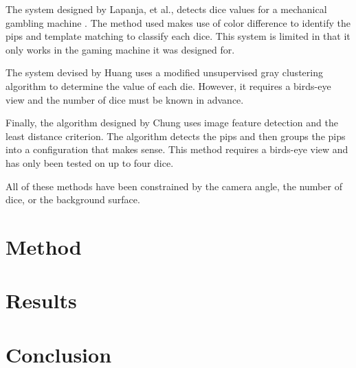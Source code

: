 \documentclass[conference]{IEEEtran}
\begin{document}
The system designed by Lapanja, et al., detects dice values for a mechanical gambling machine \cite{Lapanjaa}.
The method used makes use of color difference to identify the pips and template matching to classify each dice.
This system is limited in that it only works in the gaming machine it was designed for.

The system devised by Huang \cite{Huang2008} uses a modified unsupervised gray clustering algorithm to determine the value of each die.
However, it requires a birds-eye view and the number of dice must be known in advance.

Finally, the algorithm designed by Chung \cite{Chung2009} uses image feature detection and the least distance criterion.
The algorithm detects the pips and then groups the pips into a configuration that makes sense.
This method requires a birds-eye view and has only been tested on up to four dice.

All of these methods have been constrained by the camera angle, the number of dice, or the background surface.

\section{Method}


\section{Results}

\section{Conclusion}

\printbibliography
\end{document}
